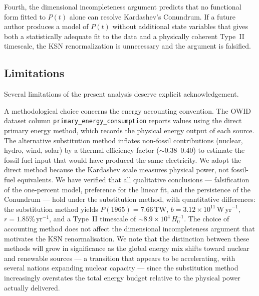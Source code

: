\documentclass[final,5p,times,twocolumn,authoryear]{elsarticle}
\begin{document}
Fourth, the dimensional incompleteness argument predicts that
no functional form fitted to $P(t)$ alone can resolve
Kardashev's Conundrum. If a future author produces a model
of $P(t)$ without additional state variables that gives both
a statistically adequate fit to the data and a physically
coherent Type~II timescale, the KSN renormalization is
unnecessary and the argument is falsified.
 
\subsection{Limitations}
\label{sec:limitations}
 
Several limitations of the present analysis deserve explicit
acknowledgement.

A methodological choice concerns the energy accounting convention.
The OWID dataset column \texttt{primary\_energy\_consumption} reports
values using the direct primary energy method, which records the
physical energy output of each source. The alternative substitution
method inflates non-fossil contributions (nuclear, hydro, wind, solar)
by a thermal efficiency factor ($\sim 0.38$--$0.40$) to estimate the
fossil fuel input that would have produced the same electricity.
We adopt the direct method because the Kardashev scale measures
physical power, not fossil-fuel equivalents. We have verified that
all qualitative conclusions --- falsification of the one-percent
model, preference for the linear fit, and the persistence of the
Conundrum --- hold under the substitution method, with quantitative
differences: the substitution method yields $P(1965) = 7.66\,
\mathrm{TW}$, $b = 3.12 \times 10^{11}\,\mathrm{W\,yr}^{-1}$,
$r = 1.85\%\,\mathrm{yr}^{-1}$, and a Type~II timescale of
$\sim 8.9 \times 10^4\,H_0^{-1}$. The choice of accounting method
does not affect the dimensional incompleteness argument that motivates
the KSN renormalisation. We note that the distinction between these
methods will grow in significance as the global energy mix shifts
toward nuclear and renewable sources --- a transition that appears
to be accelerating, with several nations expanding nuclear capacity
--- since the substitution method increasingly overstates the total
energy budget relative to the physical power actually delivered.
\end{document}
